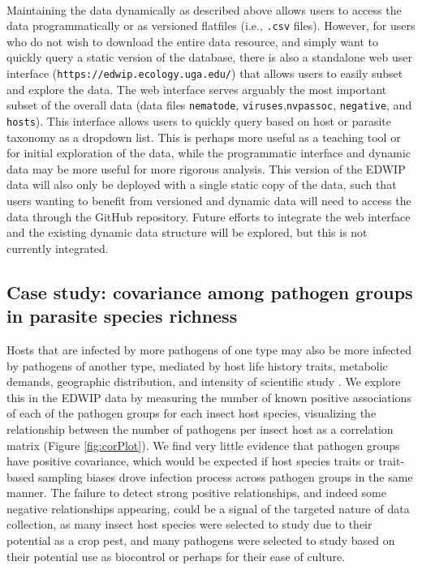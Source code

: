\documentclass[12pt]{article}
\begin{document}
\paragraph*{}
Maintaining the data dynamically as described above allows users to access the data programmatically or as versioned flatfiles (i.e., \texttt{.csv} files). However, for users who do not wish to download the entire data resource, and simply want to quickly query a static version of the database, there is also a standalone web user interface (\texttt{https://edwip.ecology.uga.edu/}) that allows users to easily subset and explore the data. The web interface serves arguably the most important subset of the overall data (data files \texttt{nematode}, \texttt{viruses},\texttt{nvpassoc}, \texttt{negative}, and \texttt{hosts}). This interface allows users to quickly query based on host or parasite taxonomy as a dropdown list. This is perhaps more useful as a teaching tool or for initial exploration of the data, while the programmatic interface and dynamic data may be more useful for more rigorous analysis. This version of the EDWIP data will also only be deployed with a single static copy of the data, such that users wanting to benefit from versioned and dynamic data will need to access the data through the GitHub repository. Future efforts to integrate the web interface and the existing dynamic data structure will be explored, but this is not currently integrated. 








\subsection*{Case study: covariance among pathogen groups in parasite species richness }

Hosts that are infected by more pathogens of one type may also be more infected by pathogens of another type, mediated by host life history traits, metabolic demands, geographic distribution, and intensity of scientific study \citep{dallas2021}. We explore this in the EDWIP data by measuring the number of known positive associations of each of the pathogen groups for each insect host species, visualizing the relationship between the number of pathogens per insect host as a correlation matrix (Figure \ref{fig:corPlot}). We find very little evidence that pathogen groups have positive covariance, which would be expected if host species traits or trait-based sampling biases drove infection process across pathogen groups in the same manner. The failure to detect strong positive relationships, and indeed some negative relationships appearing, could be a signal of the targeted nature of data collection, as many insect host species were selected to study due to their potential as a crop pest, and many pathogens were selected to study based on their potential use as biocontrol or perhaps for their ease of culture. 
\end{document}
